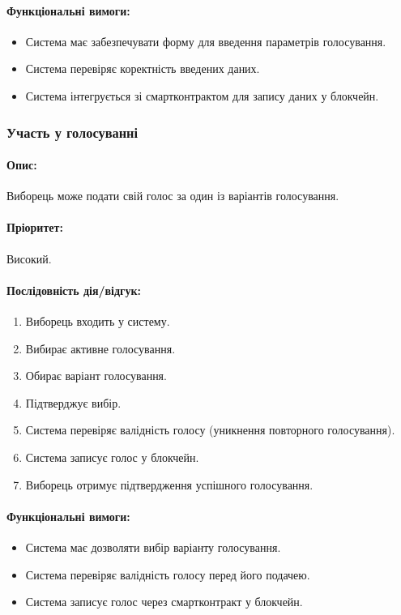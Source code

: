 \documentclass[14pt]{extreport}
\newcounter{req}[subsubsection]
\newcommand\req{\arabic{req}\stepcounter{req}}
\begin{document}
  \paragraph{Функціональні вимоги:}  
  \begin{itemize}[leftmargin=*,label=REQ-.\req:]  
      \item Система має забезпечувати форму для введення параметрів голосування.  
      \item Система перевіряє коректність введених даних.  
      \item Система інтегрується зі смартконтрактом для запису даних у блокчейн.  
  \end{itemize}

  \subsubsection{Участь у голосуванні}  
  \paragraph{Опис:} Виборець може подати свій голос за один із варіантів голосування.  
  \paragraph{Пріоритет:} Високий.  
  \paragraph{Послідовність дія/відгук:}  
  \begin{enumerate}  
      \item Виборець входить у систему.  
      \item Вибирає активне голосування.  
      \item Обирає варіант голосування.  
      \item Підтверджує вибір.  
      \item Система перевіряє валідність голосу (уникнення повторного голосування).  
      \item Система записує голос у блокчейн.  
      \item Виборець отримує підтвердження успішного голосування.  
  \end{enumerate}  
  \paragraph{Функціональні вимоги:}  
  \begin{itemize}[leftmargin=*,label=REQ-.\req:]  
      \item Система має дозволяти вибір варіанту голосування.  
      \item Система перевіряє валідність голосу перед його подачею.  
      \item Система записує голос через смартконтракт у блокчейн.  
  \end{itemize}  
\end{document}
